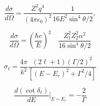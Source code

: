 \begin{equation}
  \frac{d\sigma}{d\Omega} = \frac{Z^2 q^4}{(4\pi\epsilon_0)^2}
  \frac{1}{16E^2 \sin^4 \theta/2} ,
\end{equation}

\begin{equation}
\frac{d\sigma}{d \Omega}=\left(\frac{\hbar c}{E}\right)^2 \quad \frac{Z_1^2 Z_2^2 \alpha^2}{16 \sin ^4 \theta / 2}
\end{equation}

\begin{equation}
  \sigma_{\ell} = \frac{4\pi}{k^2}
                  \frac{(2\ell+1)(\Gamma/2)^2}{[(E-E_r)^2+\Gamma^2/4]}
\end{equation}

\begin{equation}
\frac{d(\cot \delta_{\ell})}{dE} \bigg\rvert_{E=E_r} = - \frac{2}{\Gamma}
\end{equation}

